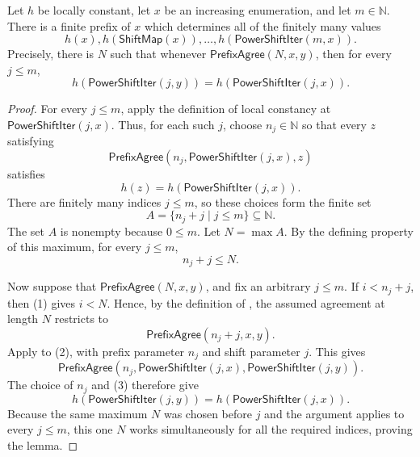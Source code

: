 \begin{lemma}
Let $h$ be locally constant, let $x$ be an increasing enumeration, and let
$m\in\mathbb N$.  There is a finite prefix of $x$ which determines all of
the finitely many values
\[
h(x),h(\mathsf{ShiftMap}(x)),\ldots,
h(\mathsf{PowerShiftIter}(m,x)).
\]
Precisely, there is $N$ such that whenever
$\mathsf{PrefixAgree}(N,x,y)$, then for every $j\leq m$,
\[
h(\mathsf{PowerShiftIter}(j,y))
=h(\mathsf{PowerShiftIter}(j,x)).
\]
\end{lemma}
\begin{proof}
For every $j\leq m$, apply the definition of local constancy
 at $\mathsf{PowerShiftIter}(j,x)$.  Thus, for each
such $j$, choose $n_j\in\mathbb N$ so that every $z$ satisfying
\[
\mathsf{PrefixAgree}(n_j,\mathsf{PowerShiftIter}(j,x),z)
\]
satisfies
\[
h(z)=h(\mathsf{PowerShiftIter}(j,x)).
\]
There are finitely many indices $j\leq m$, so these choices form the finite
set
\[
A=\{n_j+j\mid j\leq m\}\subseteq\mathbb N.
\]
The set $A$ is nonempty because $0\leq m$.  Let $N=\max A$.  By the defining
property of this maximum, for every $j\leq m$,
\[
n_j+j\leq N. \tag{1}
\]

Now suppose that $\mathsf{PrefixAgree}(N,x,y)$, and fix an arbitrary
$j\leq m$.  If $i<n_j+j$, then (1) gives $i<N$.  Hence, by the definition of
, the assumed agreement at length $N$ restricts to
\[
\mathsf{PrefixAgree}(n_j+j,x,y). \tag{2}
\]
Apply  to (2), with prefix parameter
$n_j$ and shift parameter $j$.  This gives
\[
\mathsf{PrefixAgree}(n_j,\mathsf{PowerShiftIter}(j,x),
  \mathsf{PowerShiftIter}(j,y)). \tag{3}
\]
The choice of $n_j$ and (3) therefore give
\[
h(\mathsf{PowerShiftIter}(j,y))
 =h(\mathsf{PowerShiftIter}(j,x)).
\]
Because the same maximum $N$ was chosen before $j$ and the argument applies
to every $j\leq m$, this one $N$ works simultaneously for all the required
indices, proving the lemma.
\end{proof}
